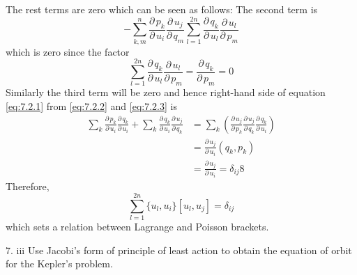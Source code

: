 \documentclass[12pt]{article}
\newcommand{\parr}[2]{\frac{\partial \,#1}{\partial \,#2}}
\begin{document}
\begin{soln}
    The rest terms are zero which can be seen as follows: The second term is 
    \[-\sum_{k,m}^n\parr{p_k}{u_i}\parr{u_j}{q_m}\sum_{l=1}^{2n}\parr{q_k}{u_l}\parr{u_l}{p_m}\]
    which is zero since the factor
    \[\sum_{l=1}^{2n}\parr{q_k}{u_l}\parr{u_l}{p_m}=\parr{q_k}{p_m}=0 \]
    Similarly the third term will be zero and hence right-hand side of equation \eqref{eq:7.2.1} from  \eqref{eq:7.2.2} and \eqref{eq:7.2.3} is
    \begin{align*}
        \sum_k \parr{p_k}{u_i}\parr{q_k}{u_i}+\sum_k \parr{q_k}{u_i}\parr{u_j}{q_k}&=\sum_k \left( \parr{u_j}{p_k}\parr{u_j}{q_k}\parr{q_k}{u_i} \right)\\
        &=\parr{u_j}{u_i}(q_k,p_k)\\
        &=\parr{u_j}{u_i}=\delta_{ij}8
    \end{align*}
    Therefore,
    \[\sum_{l=1}^{2n} \{u_l,u_i\}[u_l,u_j]=\delta_{ij}\]
    which sets a relation between Lagrange and Poisson brackets.
\end{soln}
\begin{prob}{7. iii}
    Use Jacobi's form of principle of least action to obtain the equation of orbit for the Kepler's problem.
\end{prob}
\end{document}
